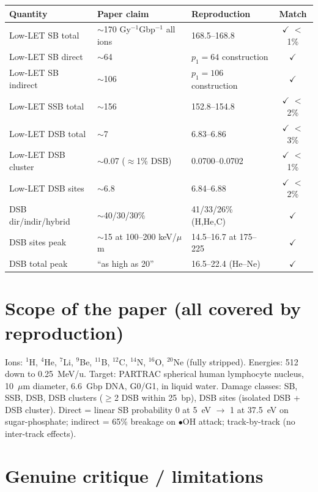 \documentclass[11pt]{article}
\begin{document}
\begin{longtable}{p{5.3cm}p{4cm}p{4cm}c}
\toprule
Quantity & Paper claim & Reproduction & Match \\
\midrule
Low-LET SB total       & $\sim$170 Gy$^{-1}$Gbp$^{-1}$ all ions & 168.5--168.8 & $\checkmark$ $<$1\% \\
Low-LET SB direct      & $\sim$64            & $p_1{=}64$ construction & $\checkmark$ \\
Low-LET SB indirect    & $\sim$106           & $p_1{=}106$ construction & $\checkmark$ \\
Low-LET SSB total      & $\sim$156           & 152.8--154.8 & $\checkmark$ $<$2\% \\
Low-LET DSB total      & $\sim$7             & 6.83--6.86 & $\checkmark$ $<$3\% \\
Low-LET DSB cluster    & $\sim$0.07 ($\approx$1\% DSB) & 0.0700--0.0702 & $\checkmark$ $<$1\% \\
Low-LET DSB sites      & $\sim$6.8           & 6.84--6.88 & $\checkmark$ $<$2\% \\
DSB dir/indir/hybrid   & $\sim$40/30/30\%    & 41/33/26\% (H,He,C) & $\checkmark$ \\
DSB sites peak         & $\sim$15 at 100--200 keV/$\mu$m & 14.5--16.7 at 175--225 & $\checkmark$ \\
DSB total peak         & ``as high as 20''   & 16.5--22.4 (He--Ne) & $\checkmark$ \\
\bottomrule
\end{longtable}

\section{Scope of the paper (all covered by reproduction)}
Ions: $^1$H, $^4$He, $^7$Li, $^9$Be, $^{11}$B, $^{12}$C, $^{14}$N, $^{16}$O, $^{20}$Ne (fully stripped). Energies: 512 down to 0.25~MeV/u. Target: PARTRAC spherical human lymphocyte nucleus, 10~$\mu$m diameter, 6.6~Gbp DNA, G0/G1, in liquid water. Damage classes: SB, SSB, DSB, DSB clusters ($\geq$2 DSB within 25~bp), DSB sites (isolated DSB + DSB cluster). Direct = linear SB probability 0 at 5~eV $\rightarrow$ 1 at 37.5~eV on sugar-phosphate; indirect = 65\% breakage on $\bullet$OH attack; track-by-track (no inter-track effects).

\section{Genuine critique / limitations}\label{sec:limits}
\end{document}
